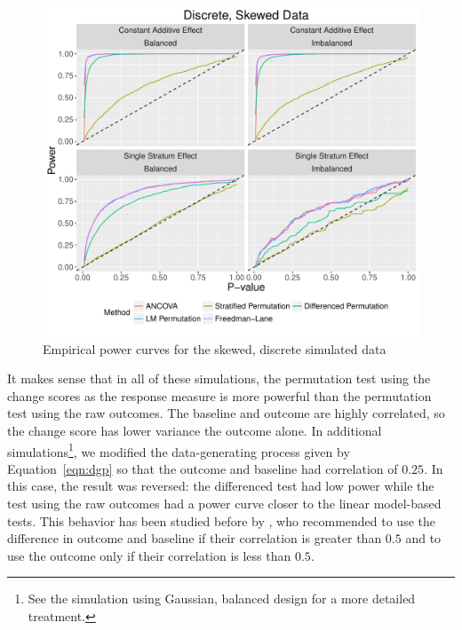 \documentclass[11pt]{article}
\begin{document}
\begin{figure}
\centering
\includegraphics[width = \textwidth]{fig/skewed_simulation_power}
\caption{Empirical power curves for the skewed, discrete simulated data}
\label{fig:skewed_sim_power}
\end{figure}

\begin{center}

\end{center}

It makes sense that in all of these simulations, the permutation test using the change scores as the response measure is more powerful than the permutation test using the raw outcomes.
The baseline and outcome are highly correlated, so the change score has lower variance the outcome alone.
In additional simulations\footnote{
See the simulation using Gaussian, balanced design for a more detailed treatment.}, 
we modified the data-generating process given by Equation~\ref{eqn:dgp} so that the outcome and baseline had correlation of $0.25$.
In this case, the result was reversed: 
the differenced test had low power while the test using the raw outcomes had a power curve closer to the linear model-based tests.
This behavior has been studied before by \cite{frison_repeated_1992}, who recommended to use the difference in outcome and baseline if their correlation is greater than $0.5$ and to use the outcome only if their correlation is less than $0.5$.
\end{document}
